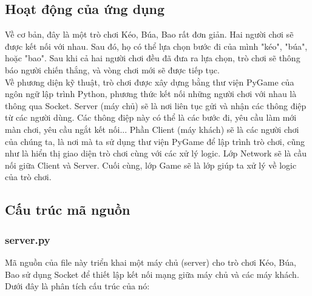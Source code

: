 \documentclass[a4paper]{article}
\begin{document}
\subsection{Hoạt động của ứng dụng}
Về cơ bản, đây là một trò chơi Kéo, Búa, Bao rất đơn giản. Hai người chơi sẽ được kết nối với nhau. Sau đó, họ có thể lựa chọn bước đi của mình "kéo", "búa", hoặc "bao". Sau khi cả hai người chơi đều đã đưa ra lựa chọn, trò chơi sẽ thông báo người chiến thắng, và vòng chơi mới sẽ được tiếp tục.\\
Về phương diện kỹ thuật, trò chơi được xây dựng bằng thư viện PyGame của ngôn ngữ lập trình Python, phương thức kết nối những người chơi với nhau là thông qua Socket. Server (máy chủ) sẽ là nơi liên tục gửi và nhận các thông điệp từ các người dùng. Các thông điệp này có thể là các bước đi, yêu cầu làm mới màn chơi, yêu cầu ngắt kết nối... Phần Client (máy khách) sẽ là các người chơi của chúng ta, là nơi mà ta sử dụng thư viện PyGame để lập trình trò chơi, cũng như là hiển thị giao diện trò chơi cùng với các xử lý logic. Lớp Network sẽ là cầu nối giữa Client và Server. Cuối cùng, lớp Game sẽ là lớp giúp ta xử lý về logic của trò chơi.
\subsection{Cấu trúc mã nguồn}
\subsubsection{server.py}
Mã nguồn của file này triển khai một máy chủ (server) cho trò chơi Kéo, Búa, Bao sử dụng Socket để thiết lập kết nối mạng giữa máy chủ và các máy khách. Dưới đây là phân tích cấu trúc của nó:
\end{document}
